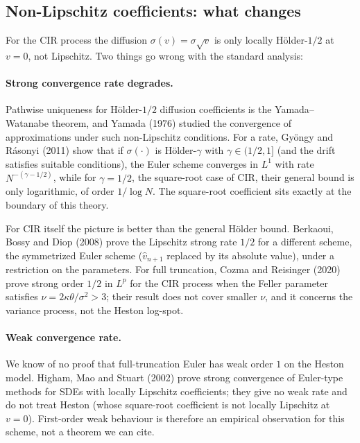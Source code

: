 \documentclass[11pt]{article}
\theoremstyle{plain}
\theoremstyle{definition}
\theoremstyle{remark}
\begin{document}
\subsection{Non-Lipschitz coefficients: what changes}

For the CIR process the diffusion $\sigma(v) = \sigma\sqrt{v}$ is only locally H\"older-$1/2$ at $v = 0$, not Lipschitz. Two things go wrong with the standard analysis:

\paragraph{Strong convergence rate degrades.} Pathwise uniqueness for H\"older-$1/2$ diffusion coefficients is the Yamada--Watanabe theorem, and Yamada (1976) studied the convergence of approximations under such non-Lipschitz conditions. For a rate, Gy\"ongy and R\'asonyi (2011) show that if $\sigma(\cdot)$ is H\"older-$\gamma$ with $\gamma \in (1/2, 1]$ (and the drift satisfies suitable conditions), the Euler scheme converges in $L^1$ with rate $N^{-(\gamma - 1/2)}$, while for $\gamma = 1/2$, the square-root case of CIR, their general bound is only logarithmic, of order $1/\log N$. The square-root coefficient sits exactly at the boundary of this theory.

For CIR itself the picture is better than the general H\"older bound. Berkaoui, Bossy and Diop (2008) prove the Lipschitz strong rate $1/2$ for a different scheme, the symmetrized Euler scheme ($\hat v_{n+1}$ replaced by its absolute value), under a restriction on the parameters. For full truncation, Cozma and Reisinger (2020) prove strong order $1/2$ in $L^p$ for the CIR process when the Feller parameter satisfies $\nu = 2\kappa\theta/\sigma^2 > 3$; their result does not cover smaller $\nu$, and it concerns the variance process, not the Heston log-spot.

\paragraph{Weak convergence rate.} We know of no proof that full-truncation Euler has weak order $1$ on the Heston model. Higham, Mao and Stuart (2002) prove strong convergence of Euler-type methods for SDEs with locally Lipschitz coefficients; they give no weak rate and do not treat Heston (whose square-root coefficient is not locally Lipschitz at $v = 0$). First-order weak behaviour is therefore an empirical observation for this scheme, not a theorem we can cite.
\end{document}

